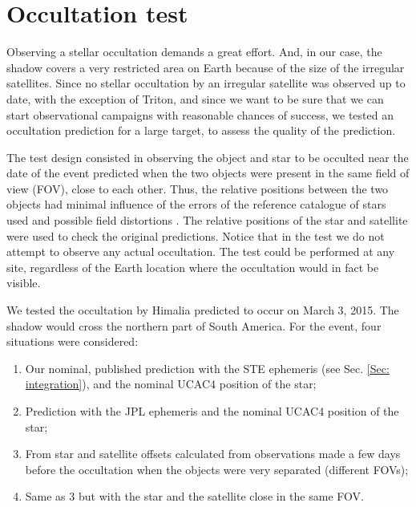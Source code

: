 \section{Occultation test} \label{Sec: testes}

Observing a stellar occultation demands a great effort. And, in our case, the shadow covers a very restricted area on Earth because of the size of the irregular satellites. Since no stellar occultation by an irregular satellite was observed up to date, with the exception of Triton, and since we want to be sure that we can start observational campaigns with reasonable chances of success, we tested an occultation prediction for a large target, to assess the quality of the prediction.

The test design consisted in observing the object and star to be occulted near the date of the event predicted when the two objects were present in the same field of view (FOV), close to each other. Thus, the relative positions between the two objects had minimal influence of the errors of the reference catalogue of stars used and possible field distortions \citep[and references therein]{Peng2008}. The relative positions of the star and satellite were used to check the original predictions. Notice that in the test we do not attempt to observe any actual occultation. The test could be performed at any site, regardless of the Earth location where the occultation would in fact be visible. 

We tested the occultation by Himalia predicted to occur on March 3, 2015. The shadow would cross the northern part of South America. For the event, four situations were considered:
\begin{enumerate}[I]
\item Our nominal, published prediction with the STE ephemeris (see Sec. \ref{Sec: integration}), and the nominal UCAC4 position of the star;
\item Prediction with the JPL ephemeris and the nominal UCAC4 position of the star;
\item From star and satellite offsets calculated from observations made a few days before the occultation when the objects were very separated (different FOVs);
\item Same as 3 but with the star and the satellite close in the same FOV.
\end{enumerate}

